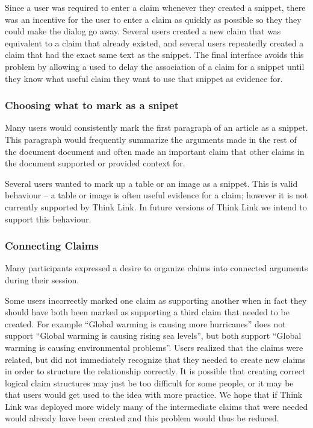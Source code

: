\documentclass{chi2009}
\newcommand{\todo}[1]{}
\begin{document}
Since a user was required to enter a claim whenever they created a snippet, there was an incentive for the user to enter a claim as quickly as possible so they they could make the dialog go away. Several users created a new claim that was equivalent to a claim that already existed, and several users repeatedly created a claim that had the exact same text as the snippet. The final interface avoids this problem by allowing a used to delay the association of a claim for a snippet until they know what useful claim they want to use that snippet as evidence for.

\todo{Need to do some kind of evaluation to show that the new interface solves these problems}


\subsubsection{Choosing what to mark as a snipet}

Many users would consistently mark the first paragraph of an article as a snippet. This paragraph would frequently summarize the arguments made in the rest of the document document and often made an important claim that other claims in the document supported or provided context for. 

Several users wanted to mark up a table or an image as a snippet. This is valid behaviour -- a table or image is often useful evidence for a claim; however it is not currently supported by Think Link. In future versions of Think Link we intend to support this behaviour.


\subsubsection{Connecting Claims}

Many participants expressed a desire to organize claims into connected arguments during their session. 

Some users incorrectly marked one claim as supporting another when in fact they should have both been marked as supporting a third claim that needed to be created. For example ``Global warming is causing more hurricanes'' does not support ``Global warming is causing rising sea levels'', but both support ``Global warming is causing environmental problems''. Users realized that the claims were related, but did not immediately recognize that they needed to create new claims in order to structure the relationship correctly. It is possible that creating correct logical claim structures may just be too difficult for some people, or it may be that users would get used to the idea with more practice. We hope that if Think Link was deployed more widely many of the intermediate claims that were needed would already have been created and this problem would thus be reduced.
\end{document}

